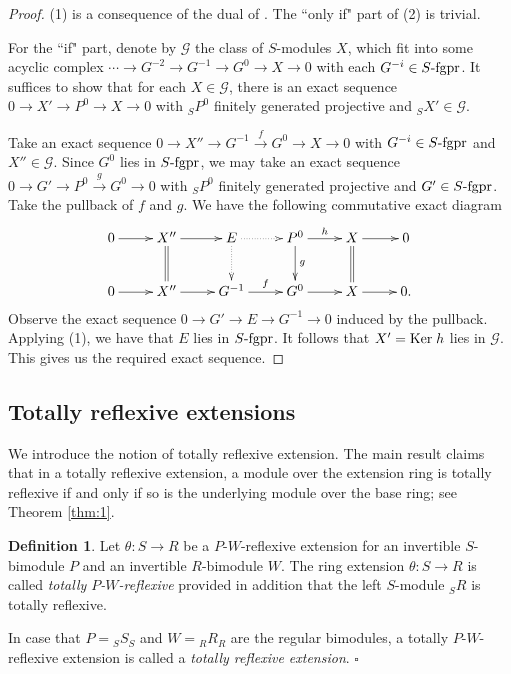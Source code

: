\documentclass[a4paper]{amsart}
\theoremstyle{definition}
\newtheorem{defn}[thm]{Definition}
\theoremstyle{remark}
\numberwithin{equation}{section}
\begin{document}
\begin{proof}
(1) is a consequence of the dual of \cite[Proposition 5.1]{AR}. The ``only if" part of (2) is trivial.

For the ``if" part, denote by $\mathcal{G}$ the class of $S$-modules $X$, which fit into some acyclic complex  $\cdots \rightarrow G^{-2}\rightarrow G^{-1}\rightarrow G^0\rightarrow X \rightarrow 0$ with each $G^{-i}\in S\mbox{-{\rm fgpr}}$. It suffices to show that for each $X\in\mathcal{G}$, there is an exact sequence $0\rightarrow X'\rightarrow P^0 \rightarrow X\rightarrow 0$ with $_SP^0$ finitely generated projective and
$_SX'\in \mathcal{G}$.

Take an exact sequence $0\rightarrow X''\rightarrow G^{-1}\stackrel{f}\rightarrow G^0\rightarrow X\rightarrow 0$ with $G^{-i}\in S\mbox{-{\rm fgpr}}$ and $X''\in \mathcal{G}$. Since $G^0$ lies in $S\mbox{-{\rm fgpr}}$, we may take an exact sequence $0\rightarrow G'\rightarrow P^0\stackrel{g}\rightarrow G^0\rightarrow 0$ with $_SP^0$ finitely generated projective and $G'\in S\mbox{-{\rm fgpr}}$. Take the pullback of $f$ and $g$. We have the following commutative exact diagram
\[\xymatrix{
0\ar[r] & X'' \ar@{=}[d]\ar[r] & E \ar@{.>}[d] \ar@{.>}[r] & P^0 \ar[d]^-{g} \ar[r]^-{h} & X \ar@{=}[d] \ar[r] & 0\\
0\ar[r] & X'' \ar[r] & G^{-1} \ar[r]^-{f} & G^0 \ar[r] & X \ar[r] & 0.}\]
Observe the exact sequence $0\rightarrow G'\rightarrow E\rightarrow G^{-1}\rightarrow 0$ induced by the pullback. Applying (1), we have that $E$ lies in $S\mbox{-{\rm fgpr}}$. It follows that $X'={\rm Ker}\; h$ lies in $\mathcal{G}$. This gives us the required exact sequence. \end{proof}

\subsection{Totally reflexive extensions} We introduce the notion of totally reflexive extension. The main result claims that in a totally reflexive extension, a module over the extension ring is totally reflexive if and only if so is the underlying module over the base ring; see Theorem \ref{thm:1}.

\begin{defn}\label{defn:2}
Let $\theta\colon S\rightarrow R$ be a $P$-$W$-reflexive extension for  an invertible $S$-bimodule $P$ and an invertible $R$-bimodule $W$. The ring extension $\theta\colon S\rightarrow R$ is called \emph{totally $P$-$W$-reflexive} provided  in addition that the left $S$-module $_SR$ is  totally reflexive.\par
In case that $P={_SS_S}$ and $W={_RR_R}$ are the regular bimodules, a totally $P$-$W$-reflexive extension is called a \emph{totally reflexive extension}. \hfill $\square$
\end{defn}
\end{document}
